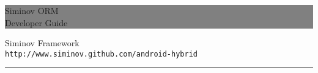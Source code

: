 \documentclass[12pt]{report}
\newcommand{\HRule}[1]{\hfill \rule{0.2\linewidth}{#1}} %
\begin{document}
\thispagestyle{empty} %


\colorbox{grey}{
	\parbox[t]{1.0\linewidth}{
		\centering \fontsize{50pt}{80pt}\selectfont %
		\vspace*{0.7cm} %
		
		\hfill Siminov ORM\\
		\hfill Developer Guide\par
		
		\vspace*{0.7cm} %
	}
}


	\vfill %


	{\centering \large 
\hfill Siminov Framework \\
\hfill \texttt{http://www.siminov.github.com/android-hybrid} \\

\HRule{1pt}} %


\clearpage %


\noindent
\setcounter{secnumdepth}{3}
\setcounter{tocdepth}{3}


\tableofcontents













\end{document}
